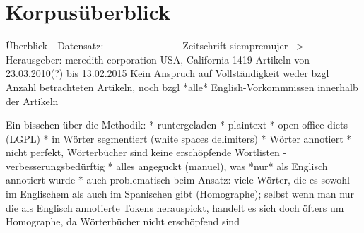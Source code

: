 \section{Korpusüberblick}

Überblick - Datensatz:
----------------------
Zeitschrift siempremujer --> Herausgeber: meredith corporation USA, California
1419 Artikeln von 23.03.2010(?) bis 13.02.2015
Kein Anspruch auf Vollständigkeit weder bzgl Anzahl betrachteten Artikeln, noch bzgl *alle* English-Vorkommnissen innerhalb der Artikeln

Ein bisschen über die Methodik:
* runtergeladen
* plaintext
* open office dicts (LGPL)
* in Wörter segmentiert (white spaces delimiters)
* Wörter annotiert
* nicht perfekt, Wörterbücher sind keine erschöpfende Wortlisten - verbesserungsbedürftig
* alles angeguckt (manuel), was *nur* als Englisch annotiert wurde
* auch problematisch beim Ansatz: viele Wörter, die es sowohl im Englischem als auch im Spanischen gibt (Homographe); selbst wenn man nur die als Englisch annotierte Tokens herauspickt, handelt es sich doch öfters um Homographe, da Wörterbücher nicht erschöpfend sind

